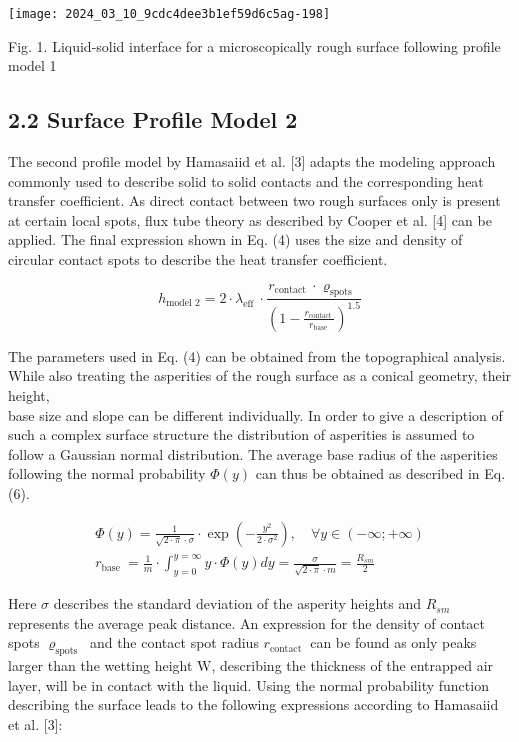 \documentclass[10pt]{article}
\begin{document}
\begin{center}
\texttt{[image: 2024\_03\_10\_9cdc4dee3b1ef59d6c5ag-198]}
\end{center}

Fig. 1. Liquid-solid interface for a microscopically rough surface following profile model 1

\subsection*{2.2 Surface Profile Model 2}
The second profile model by Hamasaiid et al. [3] adapts the modeling approach commonly used to describe solid to solid contacts and the corresponding heat transfer coefficient. As direct contact between two rough surfaces only is present at certain local spots, flux tube theory as described by Cooper et al. [4] can be applied. The final expression shown in Eq. (4) uses the size and density of circular contact spots to describe the heat transfer coefficient.


\begin{equation*}
h_{\text {model } 2}=2 \cdot \lambda_{\text {eff }} \cdot \frac{r_{\text {contact }} \cdot \varrho_{\text {spots }}}{\left(1-\frac{r_{\text {contact }}}{r_{\text {base }}}\right)^{1.5}} \tag{4}
\end{equation*}


The parameters used in Eq. (4) can be obtained from the topographical analysis. While also treating the asperities of the rough surface as a conical geometry, their height,\\
base size and slope can be different individually. In order to give a description of such a complex surface structure the distribution of asperities is assumed to follow a Gaussian normal distribution. The average base radius of the asperities following the normal probability $\Phi(y)$ can thus be obtained as described in Eq. (6).


\begin{gather*}
\Phi(y)=\frac{1}{\sqrt{2 \cdot \pi} \cdot \sigma} \cdot \exp \left(-\frac{y^{2}}{2 \cdot \sigma^{2}}\right), \quad \forall y \in(-\infty ;+\infty)  \tag{5}\\
r_{\text {base }}=\frac{1}{m} \cdot \int_{y=0}^{y=\infty} y \cdot \Phi(y) d y=\frac{\sigma}{\sqrt{2 \cdot \pi} \cdot m}=\frac{R_{s m}}{2} \tag{6}
\end{gather*}


Here $\sigma$ describes the standard deviation of the asperity heights and $R_{s m}$ represents the average peak distance. An expression for the density of contact spots $\varrho_{\text {spots }}$ and the contact spot radius $r_{\text {contact }}$ can be found as only peaks larger than the wetting height $\mathrm{W}$, describing the thickness of the entrapped air layer, will be in contact with the liquid. Using the normal probability function describing the surface leads to the following expressions according to Hamasaiid et al. [3]:
\end{document}
